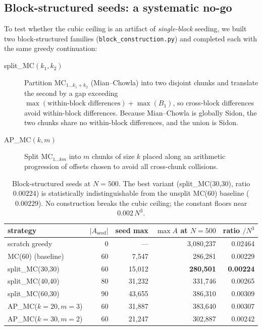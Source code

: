 \documentclass[11pt]{article}
\begin{document}
\subsection{Block-structured seeds: a systematic no-go}\label{sec:blocks}

To test whether the cubic ceiling is an artifact of \emph{single-block}
seeding, we built two block-structured families
(\texttt{block\_construction.py}) and completed each with the same
greedy continuation:

\begin{description}
\item[split\_MC$(k_1, k_2)$] Partition $\mathrm{MC}_{1 \ldots k_1+k_2}$
  (Mian--Chowla) into two disjoint chunks and translate the second by a
  gap exceeding $\max(\text{within-block differences}) + \max(B_1)$, so
  cross-block differences avoid within-block differences. Because
  Mian--Chowla is globally Sidon, the two chunks share no within-block
  differences, and the union is Sidon.
\item[AP\_MC$(k, m)$] Split $\mathrm{MC}_{1 \ldots km}$ into $m$ chunks
  of size $k$ placed along an arithmetic progression of offsets chosen
  to avoid all cross-chunk collisions.
\end{description}

\begin{table}[ht]
\centering
\begin{tabular}{l r r r r}
\toprule
strategy & $|A_{\text{seed}}|$ & seed max & $\max A$ at $N{=}500$ & ratio $/N^3$ \\
\midrule
scratch greedy        & 0  & ---    & 3{,}080{,}237 & 0.02464 \\
MC(60) (baseline)     & 60 & 7{,}547  & 286{,}281 & 0.00229 \\
split\_MC(30,30)      & 60 & 15{,}012 & \textbf{280{,}501} & \textbf{0.00224} \\
split\_MC(40,40)      & 80 & 31{,}232 & 331{,}746 & 0.00265 \\
split\_MC(60,30)      & 90 & 43{,}655 & 386{,}310 & 0.00309 \\
AP\_MC($k{=}20, m{=}3$) & 60 & 31{,}887 & 383{,}640 & 0.00307 \\
AP\_MC($k{=}30, m{=}2$) & 60 & 21{,}247 & 302{,}887 & 0.00242 \\
\bottomrule
\end{tabular}
\caption{Block-structured seeds at $N = 500$. The best variant
(split\_MC(30,30), ratio $0.00224$) is statistically indistinguishable
from the unsplit MC(60) baseline ($0.00229$). No construction breaks
the cubic ceiling; the constant floors near $0.002\,N^3$.}
\label{tab:blocks}
\end{table}
\end{document}
